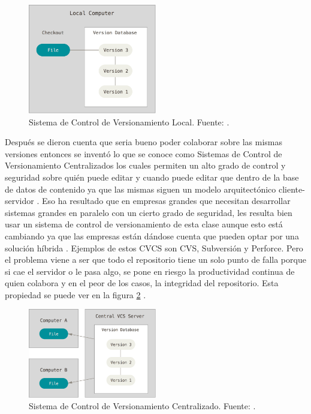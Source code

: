 \begin{figure}
  \begin{center}
    \includegraphics[width=0.5\textwidth]{Figures/lvcs.png}
  \end{center}
  \caption{Sistema de Control de Versionamiento Local. Fuente: \citep{PROGIT-Git-VCS}.}
  \label{LVCS}
\end{figure}

Después se dieron cuenta que seria bueno poder colaborar sobre las mismas versiones entonces se inventó lo que se conoce como Sistemas de Control de Versionamiento Centralizados los cuales permiten un alto grado de control y seguridad sobre quién puede editar y cuando puede editar que dentro de la base de datos de contenido ya que las mismas siguen un modelo arquitectónico cliente-servidor \citep{PROGIT-Git-VCS}. Eso ha resultado que en empresas grandes que necesitan desarrollar sistemas grandes en paralelo con un cierto grado de seguridad, les resulta bien usar un sistema de control de versionamiento de esta clase aunque esto está cambiando ya que las empresas están dándose cuenta que pueden optar por una solución híbrida \citep{CollabNet-Dist-or-Cent}. Ejemplos de estos CVCS son CVS, Subversión y Perforce. Pero el problema viene a ser que todo el repositorio tiene un solo punto de falla porque si cae el servidor o le pasa algo, se pone en riesgo la productividad continua de quien colabora y en el peor de los casos, la integridad del repositorio. Esta propiedad se puede ver en la figura \ref{CVCS} \citep{PROGIT-Git-VCS}.

\begin{figure}
  \begin{center}
  	\includegraphics[width=0.5\textwidth]{Figures/cvcs.png}
  \end{center}
  \caption{Sistema de Control de Versionamiento Centralizado. Fuente:  \citep{PROGIT-Git-VCS}.}
  \label{CVCS}
\end{figure}

